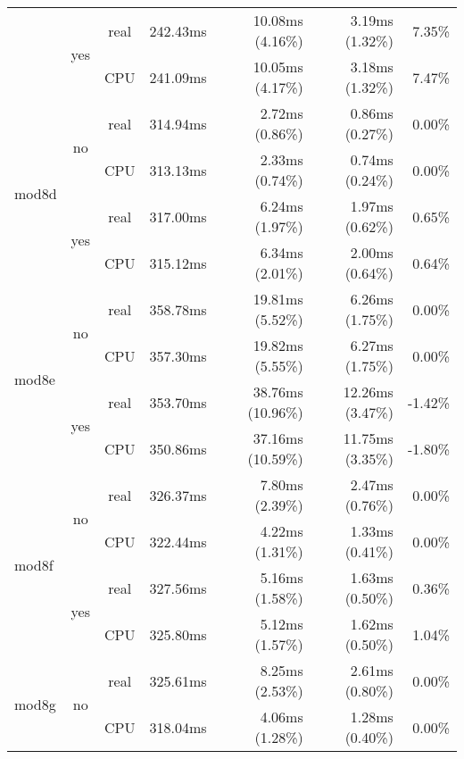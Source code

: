 \documentclass[en]{pracamgr}
\begin{document}
\begin{small}
\begin{longtable}{|l|c|c|r|r|r|r|}
                          \cline{2-7}
                          & \multirow{2}{*}{yes} & real & 242.43ms & 10.08ms (4.16\%) & 3.19ms (1.32\%) & 7.35\% \\*
                          &                      & CPU  & 241.09ms & 10.05ms (4.17\%) & 3.18ms (1.32\%) & 7.47\% \\
\hline
\multirow{4}{*}{mod8d}    & \multirow{2}{*}{no}  & real & 314.94ms & 2.72ms (0.86\%) & 0.86ms (0.27\%) & 0.00\% \\*
                          &                      & CPU  & 313.13ms & 2.33ms (0.74\%) & 0.74ms (0.24\%) & 0.00\% \\*
                          \cline{2-7}
                          & \multirow{2}{*}{yes} & real & 317.00ms & 6.24ms (1.97\%) & 1.97ms (0.62\%) & 0.65\% \\*
                          &                      & CPU  & 315.12ms & 6.34ms (2.01\%) & 2.00ms (0.64\%) & 0.64\% \\
\hline
\multirow{4}{*}{mod8e}    & \multirow{2}{*}{no}  & real & 358.78ms & 19.81ms (5.52\%) & 6.26ms (1.75\%) & 0.00\% \\*
                          &                      & CPU  & 357.30ms & 19.82ms (5.55\%) & 6.27ms (1.75\%) & 0.00\% \\*
                          \cline{2-7}
                          & \multirow{2}{*}{yes} & real & 353.70ms & 38.76ms (10.96\%) & 12.26ms (3.47\%) & -1.42\% \\*
                          &                      & CPU  & 350.86ms & 37.16ms (10.59\%) & 11.75ms (3.35\%) & -1.80\% \\
\hline
\multirow{4}{*}{mod8f}    & \multirow{2}{*}{no}  & real & 326.37ms & 7.80ms (2.39\%) & 2.47ms (0.76\%) & 0.00\% \\*
                          &                      & CPU  & 322.44ms & 4.22ms (1.31\%) & 1.33ms (0.41\%) & 0.00\% \\*
                          \cline{2-7}
                          & \multirow{2}{*}{yes} & real & 327.56ms & 5.16ms (1.58\%) & 1.63ms (0.50\%) & 0.36\% \\*
                          &                      & CPU  & 325.80ms & 5.12ms (1.57\%) & 1.62ms (0.50\%) & 1.04\% \\
\hline
\multirow{4}{*}{mod8g}    & \multirow{2}{*}{no}  & real & 325.61ms & 8.25ms (2.53\%) & 2.61ms (0.80\%) & 0.00\% \\*
                          &                      & CPU  & 318.04ms & 4.06ms (1.28\%) & 1.28ms (0.40\%) & 0.00\% \\*

\end{longtable}
\end{small}
\end{document}
